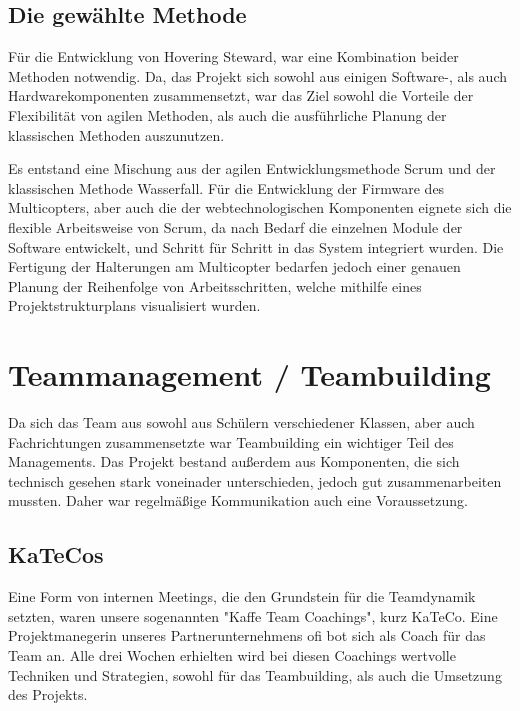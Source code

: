 \subsection{Die gewählte Methode}
Für die Entwicklung von Hovering Steward, war eine Kombination beider Methoden notwendig. Da,
das Projekt sich sowohl aus einigen Software-, als auch Hardwarekomponenten zusammensetzt, war das
Ziel sowohl die Vorteile der Flexibilität von agilen Methoden, als auch die ausführliche Planung der klassischen
Methoden auszunutzen.

Es entstand eine Mischung aus der agilen Entwicklungsmethode Scrum und der klassischen Methode Wasserfall.
Für die Entwicklung der Firmware des Multicopters, aber auch die der webtechnologischen Komponenten eignete
sich die flexible Arbeitsweise von Scrum, da nach Bedarf die einzelnen Module der Software entwickelt, und Schritt
für Schritt in das System integriert wurden.
Die Fertigung der Halterungen am Multicopter bedarfen jedoch einer genauen Planung der Reihenfolge von Arbeitsschritten,
welche mithilfe eines Projektstrukturplans visualisiert wurden.

\section{Teammanagement / Teambuilding}
Da sich das Team aus sowohl aus Schülern verschiedener Klassen, aber auch Fachrichtungen
zusammensetzte war Teambuilding ein wichtiger Teil des Managements. Das Projekt bestand außerdem
aus Komponenten, die sich technisch gesehen stark voneinader unterschieden, jedoch gut zusammenarbeiten mussten.
Daher war regelmäßige Kommunikation auch eine Voraussetzung.

  \subsection{KaTeCos}
  Eine Form von internen Meetings, die den Grundstein für die Teamdynamik setzten, waren unsere
  sogenannten "Kaffe Team Coachings", kurz KaTeCo. Eine Projektmanegerin unseres Partnerunternehmens ofi
  bot sich als Coach für das Team an. Alle drei Wochen erhielten wird bei diesen Coachings wertvolle Techniken und
  Strategien, sowohl für das Teambuilding, als auch die Umsetzung des Projekts.

